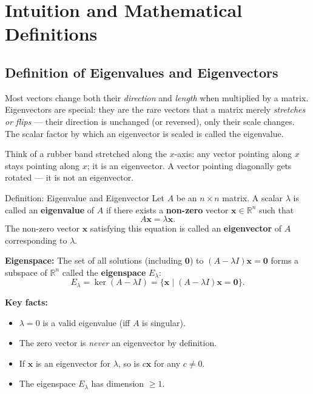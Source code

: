 \documentclass[12pt,a4paper]{article}
\begin{document}
\section{Intuition and Mathematical Definitions}

\subsection{Definition of Eigenvalues and Eigenvectors}

Most vectors change both their \emph{direction} and \emph{length} when multiplied by a matrix.
Eigenvectors are special: they are the rare vectors that a matrix merely \emph{stretches or flips}
--- their direction is unchanged (or reversed), only their scale changes.
The scalar factor by which an eigenvector is scaled is called the eigenvalue.

Think of a rubber band stretched along the $x$-axis: any vector pointing along $x$ stays pointing along $x$;
it is an eigenvector. A vector pointing diagonally gets rotated --- it is not an eigenvector.

\begin{infobox}{Definition: Eigenvalue and Eigenvector}
Let $A$ be an $n \times n$ matrix. A scalar $\lambda$ is called an \textbf{eigenvalue} of $A$ if there
exists a \textbf{non-zero} vector $\mathbf{x} \in \mathbb{R}^n$ such that
\[
  A\mathbf{x} = \lambda\mathbf{x}.
\]
The non-zero vector $\mathbf{x}$ satisfying this equation is called an \textbf{eigenvector} of $A$
corresponding to $\lambda$.

\medskip
\textbf{Eigenspace:} The set of all solutions (including $\mathbf{0}$) to $(A - \lambda I)\mathbf{x} = \mathbf{0}$
forms a subspace of $\mathbb{R}^n$ called the \textbf{eigenspace} $E_\lambda$:
\[
  E_\lambda = \ker(A - \lambda I) = \{\mathbf{x} \mid (A - \lambda I)\mathbf{x} = \mathbf{0}\}.
\]

\textbf{Key facts:}
\begin{itemize}
  \item $\lambda = 0$ is a valid eigenvalue (iff $A$ is singular).
  \item The zero vector is \emph{never} an eigenvector by definition.
  \item If $\mathbf{x}$ is an eigenvector for $\lambda$, so is $c\mathbf{x}$ for any $c \neq 0$.
  \item The eigenspace $E_\lambda$ has dimension $\geq 1$.
\end{itemize}
\end{infobox}
\end{document}
